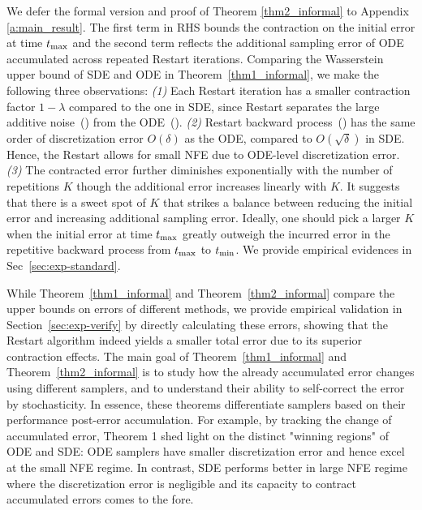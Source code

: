 We defer the formal version and proof of Theorem \ref{thm2_informal} to Appendix \ref{a:main_result}. The first term in RHS bounds the contraction on the initial error at time $t_{\textrm{max}}$ and the second term reflects the additional sampling error of ODE accumulated across repeated Restart iterations. Comparing the Wasserstein upper bound of SDE and ODE in Theorem~\ref{thm1_informal}, we make the following three observations: \textit{(1)} Each Restart iteration has a smaller contraction factor $1-\lambda$ compared to the one in SDE, since Restart separates the large additive noise~() from the ODE~(). \textit{(2)} Restart backward process~() has the same order of discretization error $O(\delta)$ as the ODE, compared to $O(\sqrt{\delta})$ in SDE. Hence, the Restart allows for small NFE due to ODE-level discretization error. \textit{(3)} The contracted error further diminishes exponentially with the number of repetitions $K$ though the additional error increases linearly with $K$. It suggests that there is a sweet spot of $K$ that strikes a balance between reducing the initial error and increasing additional sampling error. Ideally, one should pick a larger $K$ when the initial error at time $t_{\textrm{max}}$ greatly outweigh the incurred error in the repetitive backward process from $t_{\textrm{max}}$ to $t_{\textrm{min}}$. We provide empirical evidences in Sec~\ref{sec:exp-standard}.

While Theorem~\ref{thm1_informal} and Theorem~\ref{thm2_informal} compare the upper bounds on errors of different methods, we provide empirical validation in Section~\ref{sec:exp-verify} by directly calculating these errors, showing that the Restart algorithm indeed yields a smaller total error due to its superior contraction effects. The main goal of Theorem~\ref{thm1_informal} and Theorem~\ref{thm2_informal} is to study how the already accumulated error changes using different samplers, and to understand their ability to self-correct the error by stochasticity. In essence, these theorems differentiate samplers based on their performance post-error accumulation. For example, by tracking the change of accumulated error, Theorem 1 shed light on the distinct "winning regions" of ODE and SDE: ODE samplers have smaller discretization error and hence excel at the small NFE regime. In contrast, SDE performs better in large NFE regime where the discretization error is negligible and its capacity to contract accumulated errors comes to the fore.



